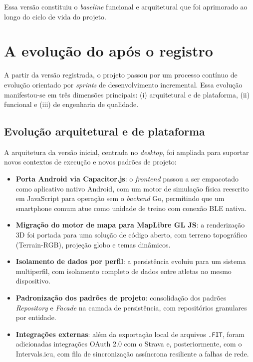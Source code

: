 Essa versão constituiu o \textit{baseline} funcional e arquitetural que foi
aprimorado ao longo do ciclo de vida do projeto.

\section{A evolução do \argus{} após o registro}
\label{sec:evolucao}

A partir da versão registrada, o projeto passou por um processo contínuo de
evolução orientado por \textit{sprints} de desenvolvimento incremental. Essa
evolução manifestou-se em três dimensões principais: (i) arquitetural e de
plataforma, (ii) funcional e (iii) de engenharia de qualidade.

\subsection{Evolução arquitetural e de plataforma}
\label{sec:evolucao-arquitetura}

A arquitetura da versão inicial, centrada no \textit{desktop}, foi ampliada
para suportar novos contextos de execução e novos padrões de projeto:

\begin{itemize}
    \item \textbf{Porta Android via Capacitor.js}: o \textit{frontend} passou a
        ser empacotado como aplicativo nativo Android, com um motor de
        simulação física reescrito em JavaScript para operação sem o
        \textit{backend} Go, permitindo que um smartphone comum atue como
        unidade de treino com conexão BLE nativa.
    \item \textbf{Migração do motor de mapa para MapLibre GL JS}: a renderização
        3D foi portada para uma solução de código aberto, com terreno
        topográfico (Terrain-RGB), projeção globo e temas dinâmicos.
    \item \textbf{Isolamento de dados por perfil}: a persistência evoluiu para
        um sistema multiperfil, com isolamento completo de dados entre atletas
        no mesmo dispositivo.
    \item \textbf{Padronização dos padrões de projeto}: consolidação dos
        padrões \textit{Repository} e \textit{Facade} na camada de persistência,
        com repositórios granulares por entidade.
    \item \textbf{Integrações externas}: além da exportação local de arquivos
        \texttt{.FIT}, foram adicionadas integrações OAuth 2.0 com o Strava e,
        posteriormente, com o Intervals.icu, com fila de sincronização
        assíncrona resiliente a falhas de rede.
\end{itemize}

